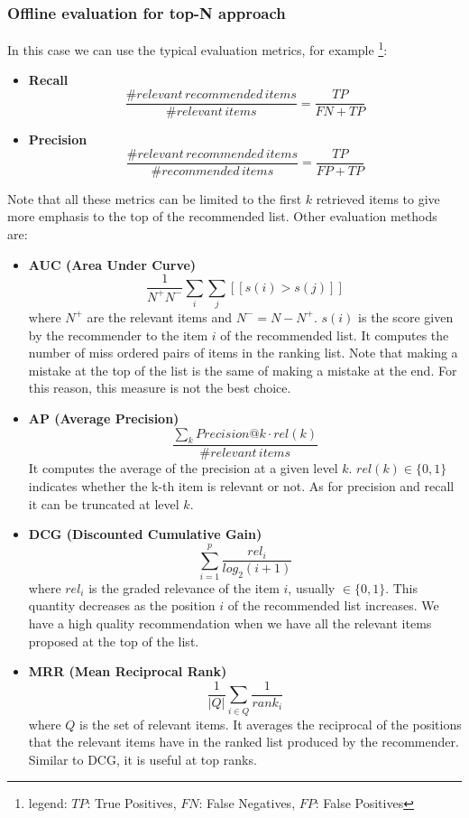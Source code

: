 \subsubsection{Offline evaluation for top-N approach}
In this case we can use the typical evaluation metrics, for example \footnote{legend: $TP$: True Positives, $FN$: False Negatives, $FP$: False Positives}:
\begin{itemize}
    \item \textbf{Recall}
    \[\frac{\# relevant \, recommended \,items}{\# relevant \, items} = \frac{TP}{FN + TP}\]
    \item \textbf{Precision}
    \[\frac{\# relevant \, recommended \,items}{\# recommended \, items} = \frac{TP}{FP + TP}\]
\end{itemize}
Note that all these metrics can be limited to the first $k$ retrieved items to give more emphasis to the top of the recommended list.\newline\newline
Other evaluation methods are:
\begin{itemize}
    \item \textbf{AUC (Area Under Curve)}
    \[\frac{1}{N^{+}N^{-}}\sum_{i}\sum_{j}[\![s(i) > s(j)]\!]\]
    where $N^{+}$ are the relevant items and $N^{-} = N - N^{+}$. $s(i)$ is the score given by the recommender to the item $i$ of the recommended list. It computes the number of miss ordered pairs of items in the ranking list. Note that making a mistake at the top of the list is the same of making a mistake at the end. For this reason, this measure is not the best choice.
    \item \textbf{AP (Average Precision)}
    \[\frac{\sum_{k}Precision@k\cdot rel(k)}{\# relevant \, items}\]
    It computes the average of the precision at a given level $k$. $rel(k) \in \{0,1\}$ indicates whether the k-th item is relevant or not. As for precision and recall it can be truncated at level $k$.
    \item \textbf{DCG (Discounted Cumulative Gain)}
    \[\sum_{i=1}^{p}\frac{rel_{i}}{log_{2}(i+1)}\]
    where $rel_{i}$ is the graded relevance of the item $i$, usually $\in \{0,1\}$. This quantity decreases as the position $i$ of the recommended list increases. We have a high quality recommendation when we have all the relevant items proposed at the top of the list.
    \item \textbf{MRR (Mean Reciprocal Rank)}
    \[\frac{1}{|Q|}\sum_{i \in Q}\frac{1}{rank_{i}}\]
    where $Q$ is the set of relevant items. It averages the reciprocal of the positions that the relevant items have in the ranked list produced by the recommender. Similar to DCG, it is useful at top ranks.
\end{itemize}
